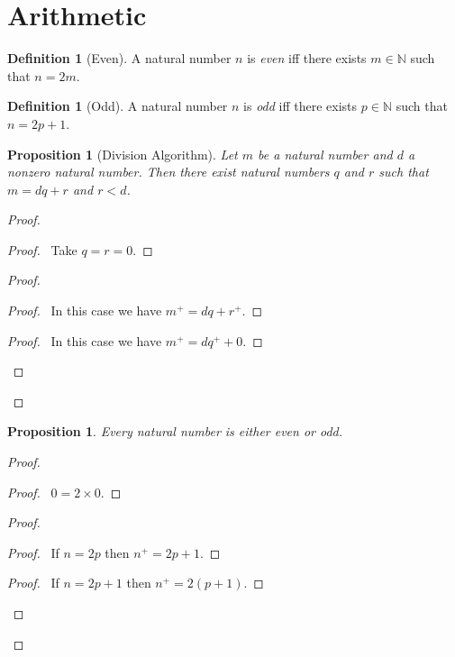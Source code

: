 \documentclass{book}
\let\qed\relax
\newtheorem{prop}[ax]{Proposition}
\theoremstyle{definition}
\newtheorem{df}[ax]{Definition}
\begin{document}
\section{Arithmetic}

\begin{df}[Even]
A natural number $n$ is \emph{even} iff there exists $m \in \mathbb{N}$ such that $n = 2m$.
\end{df}

\begin{df}[Odd]
A natural number $n$ is \emph{odd} iff there exists $p \in \mathbb{N}$ such that $n = 2p+1$.
\end{df}

\begin{prop}[Division Algorithm]
Let $m$ be a natural number and $d$ a nonzero natural number. Then there exist natural numbers $q$ and $r$ such that $m = dq + r$ and $r < d$.
\end{prop}

\begin{proof}
\pf
{}
\begin{proof}
	\pf\ Take $q = r = 0$.
\end{proof}
\begin{proof}
	\begin{proof}
		\pf\ In this case we have $m^+ = dq + r^+$.
	\end{proof}
	\begin{proof}
		\pf\ In this case we have $m^+ = dq^+ + 0$.
	\end{proof}
\end{proof}
\qed
\end{proof}

\begin{prop}
Every natural number is either even or odd.
\end{prop}

\begin{proof}
\pf
{}
\begin{proof}
	\pf\ $0 = 2 \times 0$.
\end{proof}
\begin{proof}
	\pf
	\begin{proof}
		\pf\ If $n = 2p$ then $n^+ = 2p+1$.
	\end{proof}
	\begin{proof}
		\pf\ If $n = 2p+1$ then $n^+ = 2(p+1)$.
	\end{proof}
\end{proof}
\qed
\end{proof}
\end{document}
